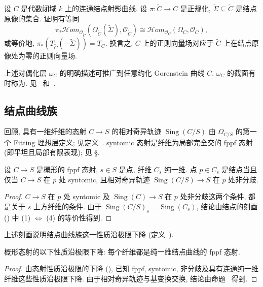 \newpage
\begin{exercise}[很好的练习]\label{src:6.2.22}
设 $C$ 是代数闭域 $k$ 上的连通结点射影曲线. 设 $\pi:\widetilde C\to\allowbreak C$ 是正规化, $\widetilde\Sigma\subseteq\widetilde C$ 是结点原像的集合. 证明有等同
\[
\pi_*\mathcal H om_{\mathcal O_{\widetilde C}}(\Omega_{\widetilde C}(\widetilde\Sigma),\mathcal O_{\widetilde C})\cong\mathcal H om_{\mathcal O_C}(\Omega_C,\mathcal O_C),
\]
或等价地, $\pi_*(T_{\widetilde C}(-\widetilde\Sigma))=T_C$. 换言之, $C$ 上的正则向量场对应于 $\widetilde C$ 上在结点原像处为零的正则向量场.
\end{exercise}
\begin{remark}\label{src:6.2.23}
上述对偶化层 $\omega_C$ 的明确描述可推广到任意约化 Gorenstein 曲线 $C$. $\omega_C$ 的截面有时称为. 见~\cite[命题 6.2]{BHPV04} 和~\cite[第四章]{Ser88}.
\end{remark}
\subsection{结点曲线族}\label{src:6.2.5-subsection}
回顾, 具有一维纤维的态射 $C\to\allowbreak S$ 的相对奇异轨迹 $\operatorname{Sing}(C/S)$ 由 $\Omega_{C/S}$ 的第一个 Fitting 理想层定义; 见定义~. syntomic 态射是纤维为局部完全交的 fppf 态射 (即平坦且局部有限表现); 见 \S{}.
\begin{proposition}\label{src:6.2.24}
设 $C\to\allowbreak S$ 是概形的 fppf 态射, $s\in S$ 是点, 纤维 $C_s$ 纯一维. 点 $p\in C_s$ 是结点当且仅当 $C\to\allowbreak S$ 在 $p$ 处 syntomic, 且相对奇异轨迹 $\operatorname{Sing}(C/S)\to\allowbreak S$ 在 $p$ 处非分歧.
\end{proposition}
\begin{proof}
$C\to\allowbreak S$ 在 $p$ 处 syntomic 及 $\operatorname{Sing}(C)\to\allowbreak S$ 在 $p$ 处非分歧这两个条件, 都是关于 $s$ 上方纤维的条件. 由于 $\operatorname{Sing}(C/S)_s=\operatorname{Sing}(C_s)$, 结论由结点的刻画 () 中 (1) $\Leftrightarrow$ (4) 的等价性得到.
\end{proof}
上述刻画说明结点曲线族这一性质沿极限下降 (定义~).
\begin{lemma}\label{src:6.2.25}
概形态射的以下性质沿极限下降: 每个纤维都是纯一维结点曲线的 fppf 态射.
\end{lemma}
\begin{proof}
由态射性质沿极限的下降 (), 已知 fppf, syntomic, 非分歧及具有连通纯一维纤维这些性质沿极限下降. 由于相对奇异轨迹与基变换交换, 结论由命题~ 得到.
\end{proof}
